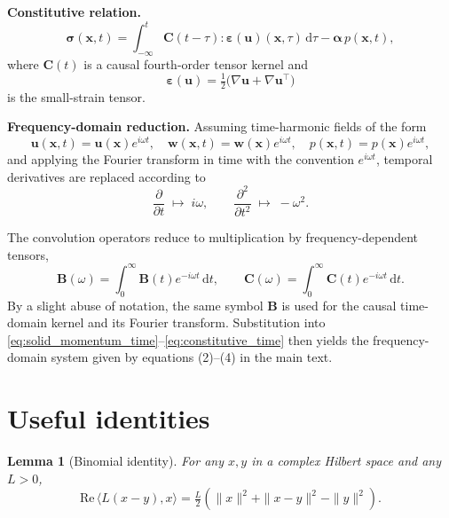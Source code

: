 \documentclass[pdflatex,sn-mathphys-num]{sn-jnl}
\theoremstyle{thmstyleone}%
\theoremstyle{thmstyletwo}%
\theoremstyle{thmstylethree}%
\newtheorem{lemma}[theorem]{Lemma}
\theoremstyle{definition}
\begin{document}
	\medskip
	
	\noindent
	\textbf{Constitutive relation.}
	\begin{equation}
		\boldsymbol{\sigma}(\mathbf{x},t)
		=
		\int_{-\infty}^{t}
		\mathbf{C}(t-\tau)
		:
		\boldsymbol{\varepsilon}(\mathbf{u})(\mathbf{x},\tau)
		\,\mathrm{d}\tau
		-
		\boldsymbol{\alpha}\,p(\mathbf{x},t),
		\label{eq:constitutive_time}
	\end{equation}
	where $\mathbf{C}(t)$ is a causal fourth-order tensor kernel and
	\[
	\boldsymbol{\varepsilon}(\mathbf{u})
	= \tfrac{1}{2}\big(\nabla \mathbf{u} + \nabla \mathbf{u}^\top\big)
	\]
	is the small-strain tensor.
	
	\medskip
	
	\noindent
	\textbf{Frequency-domain reduction.}
	Assuming time-harmonic fields of the form
	\[
	\mathbf{u}(\mathbf{x},t) = \mathbf{u}(\mathbf{x}) e^{i\omega t},
	\quad
	\mathbf{w}(\mathbf{x},t) = \mathbf{w}(\mathbf{x}) e^{i\omega t},
	\quad
	p(\mathbf{x},t) = p(\mathbf{x}) e^{i\omega t},
	\]
	and applying the Fourier transform in time with the convention $e^{i\omega t}$,
	temporal derivatives are replaced according to
	\[
	\frac{\partial}{\partial t} \;\mapsto\; i\omega,
	\qquad
	\frac{\partial^2}{\partial t^2} \;\mapsto\; -\omega^2.
	\]
	
	The convolution operators reduce to multiplication by frequency-dependent tensors,
	\[
	\mathbf{B}(\omega) = \int_{0}^{\infty} \mathbf{B}(t) e^{-i\omega t}\,\mathrm{d}t,
	\qquad
	\mathbf{C}(\omega) = \int_{0}^{\infty} \mathbf{C}(t) e^{-i\omega t}\,\mathrm{d}t.
	\]
	By a slight abuse of notation, the same symbol $\mathbf{B}$ is used for the
	causal time-domain kernel and its Fourier transform.
	Substitution into \eqref{eq:solid_momentum_time}--\eqref{eq:constitutive_time}
	then yields the frequency-domain system given by equations (2)--(4) in the main text.
	
	

	
	

	\setcounter{theorem}{0}
	
	
	\section{Useful identities}\label{sec: useful identities}
	\begin{lemma}[Binomial identity]
		\renewcommand{\thelemma}{1}
		\label{lem: stabilization identity}For any $x,y$ in a complex Hilbert space and any $L > 0$,
		\[
		\mathrm{Re}\,\langle L(x-y), x \rangle = \tfrac{L}{2}\left( \|x\|^2 + \|x-y\|^2 - \|y\|^2 \right).
		\]
	\end{lemma}
	
\end{document}
